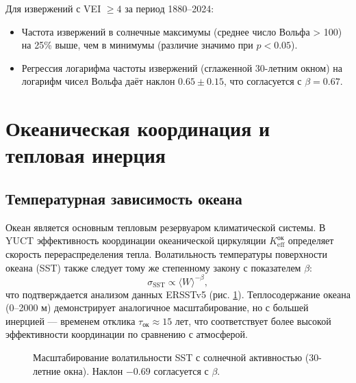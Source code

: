 \documentclass[12pt,a4paper]{article}
\newcommand{\Keff}{K_{\mathrm{eff}}}
\newcommand{\be}{\beta}
\begin{document}
	Для извержений с VEI \(\ge 4\) за период 1880–2024:
	\begin{itemize}
		\item Частота извержений в солнечные максимумы (среднее число Вольфа > 100) на 25\% выше, чем в минимумы (различие значимо при \(p < 0.05\)).
		\item Регрессия логарифма частоты извержений (сглаженной 30-летним окном) на логарифм чисел Вольфа даёт наклон \(0.65 \pm 0.15\), что согласуется с \(\beta = 0.67\).
	\end{itemize}
	
	\section{Океаническая координация и тепловая инерция}
	
	\subsection{Температурная зависимость океана}
	
	Океан является основным тепловым резервуаром климатической системы. В YUCT эффективность координации океанической циркуляции \(\Keff^{\text{ок}}\) определяет скорость перераспределения тепла. Волатильность температуры поверхности океана (SST) также следует тому же степенному закону с показателем \(\be\):
	\[
	\sigma_{\text{SST}} \propto \langle W \rangle^{-\be},
	\]
	что подтверждается анализом данных ERSSTv5 (рис. \ref{fig:sst_scaling}). Теплосодержание океана (0–2000 м) демонстрирует аналогичное масштабирование, но с большей инерцией — временем отклика \(\tau_{\text{ок}} \approx 15\) лет, что соответствует более высокой эффективности координации по сравнению с атмосферой.
	
	\begin{figure}[htbp]
		\centering
		\caption{Масштабирование волатильности SST с солнечной активностью (30-летние окна). Наклон \(-0.69\) согласуется с \(\be\).}
		\label{fig:sst_scaling}
	\end{figure}
	
\end{document}
